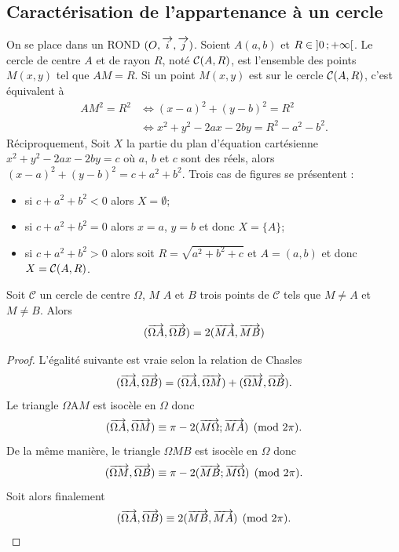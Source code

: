 \subsection{Caractérisation de l'appartenance à un cercle}
\label{sec:caractcercle}
On se place dans un ROND \((O,\overrightarrow{i},\overrightarrow{j})\). Soient \(A(a,b)\) et \(R \in \left] 0 \, ;  +\infty \right[\). Le cercle de centre \(A\) et de rayon \(R\), noté \(\mathcal{C}(A,R)\), est l'ensemble des points \(M(x,y)\) tel que \(AM=R\). Si un point \(M(x,y)\) est sur le cercle \(\mathcal{C}(A,R)\), c'est équivalent à
\begin{align}
  AM^2=R^2 & \iff (x-a)^2+(y-b)^2=R^2\\
&\iff x^2+y^2-2ax-2by=R^2-a^2-b^2.
\end{align}
Réciproquement, Soit \(X\) la partie du plan d'équation cartésienne \(x^2+y^2-2ax-2by=c\) où \(a\), \(b\) et \(c\) sont des réels, alors \((x-a)^2+(y-b)^2=c+a^2+b^2\). Trois cas de figures se présentent :
\begin{itemize}
\item si \(c+a^2+b^2<0\) alors \(X=\emptyset\);
\item si \(c+a^2+b^2=0\) alors \(x=a\), \(y=b\) et donc \(X=\{A\}\);
\item si \(c+a^2+b^2>0\) alors soit \(R=\sqrt{a^2+b^2+c}\) et \(A=(a,b)\) et donc \(X=\mathcal{C}(A,R)\).
\end{itemize}
\begin{prop}
  \label{prop:cocy}
  Soit \(\mathcal{C}\) un cercle de centre \(\Omega\), \(M\) \(A\) et \(B\) trois points de \(\mathcal{C}\) tels que \(M \neq A\) et \(M \neq B\). Alors 
  \begin{equation}
    (\overrightarrow{\Omega A},\overrightarrow{\Omega B})=2 (\overrightarrow{MA},\overrightarrow{MB})
  \end{equation}
\end{prop}
\begin{proof}
  L'égalité suivante est vraie selon la relation de Chasles
  \begin{equation}
    (\overrightarrow{\Omega A},\overrightarrow{\Omega B}) = (\overrightarrow{\Omega A},\overrightarrow{\Omega M}) + (\overrightarrow{\Omega M},\overrightarrow{\Omega B}).
  \end{equation}
  Le triangle \(\Omega \)A\( M\) est isocèle en \(\Omega\) donc
  \begin{equation}
    (\overrightarrow{\Omega A}, \overrightarrow{\Omega M}) \equiv \pi - 2 (\overrightarrow{M\Omega}; \overrightarrow{MA}) \pmod {2\pi}.
  \end{equation}
  De la même manière, le triangle \(\Omega M B\) est isocèle en \(\Omega\) donc
  \begin{equation}
    (\overrightarrow{\Omega M}, \overrightarrow{\Omega B}) \equiv \pi - 2 (\overrightarrow{MB}; \overrightarrow{M\Omega}) \pmod {2\pi}.
  \end{equation}
  Soit alors finalement 
  \begin{equation}
    (\overrightarrow{\Omega A}, \overrightarrow{\Omega B}) \equiv 2 (\overrightarrow{MB}, \overrightarrow{MA}) \pmod {2\pi}.
\end{equation}
\end{proof}

